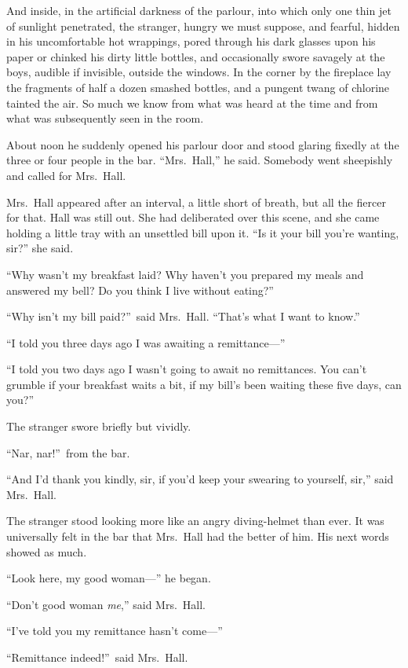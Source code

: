 And inside, in the artificial darkness of the parlour, into which only one thin jet of sunlight penetrated, the stranger, hungry we must suppose, and fearful, hidden in his uncomfortable hot wrappings, pored through his dark glasses upon his paper or chinked his dirty little bottles, and occasionally swore savagely at the boys, audible if invisible, outside the windows. In the corner by the fireplace lay the fragments of half a dozen smashed bottles, and a pungent twang of chlorine tainted the air. So much we know from what was heard at the time and from what was subsequently seen in the room.

About noon he suddenly opened his parlour door and stood glaring fixedly at the three or four people in the bar. “Mrs.\ Hall,” he said. Somebody went sheepishly and called for Mrs.\ Hall.

Mrs.\ Hall appeared after an interval, a little short of breath, but all the fiercer for that. Hall was still out. She had deliberated over this scene, and she came holding a little tray with an unsettled bill upon it. “Is it your bill you’re wanting, sir?” she said.

“Why wasn’t my breakfast laid? Why haven’t you prepared my meals and answered my bell? Do you think I live without eating?”

“Why isn’t my bill paid?”\ said Mrs.\ Hall. “That’s what I want to know.”

“I told you three days ago I was awaiting a remittance—”

“I told you two days ago I wasn’t going to await no remittances. You can’t grumble if your breakfast waits a bit, if my bill’s been waiting these five days, can you?”

The stranger swore briefly but vividly.

“Nar, nar!”\ from the bar.

“And I’d thank you kindly, sir, if you’d keep your swearing to yourself, sir,” said Mrs.\ Hall.

The stranger stood looking more like an angry diving-helmet than ever. It was universally felt in the bar that Mrs.\ Hall had the better of him. His next words showed as much.

“Look here, my good woman—” he began.

“Don’t good woman \emph{me},” said Mrs.\ Hall.

“I’ve told you my remittance hasn’t come—”

“Remittance indeed!”\ said Mrs.\ Hall.

